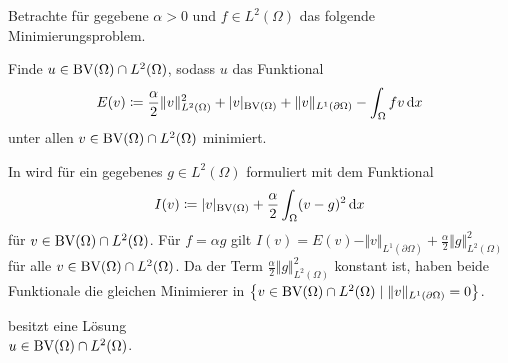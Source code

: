 Betrachte für gegebene $\alpha>0$ und $f\in L^2(\Omega)$ das 
folgende Minimierungsproblem. 

\begin{problem}\label{prob:continuousProblem}
  Finde $u\in \textup{BV}(\Omega)\cap L^2(\Omega)$, sodass
  $u$ das Funktional
  \begin{align}\label{eq:continuousProblem}
    E(v)\coloneqq \frac{\alpha}{2}\Vert v\Vert_{L^2(\Omega)}^2 + |v|_{\textup{BV}(\Omega)}
    +\Vert v\Vert_{L^1(\partial\Omega)}-\int_\Omega fv\,\mathrm{d}x
  \end{align}
  unter allen $v\in\textup{BV}(\Omega)\cap L^2(\Omega)$ minimiert.
\end{problem}

\begin{remark}
  In \cite[Kapitel~10.1.3]{Bar15} wird  für ein
  gegebenes $g\in L^2(\Omega)$ formuliert
  mit dem Funktional 
  \begin{align*}
    I(v)\coloneqq |v|_{\textup{BV}(\Omega)} + \frac{\alpha}{2}\int_\Omega (v-g)^2\,\mathrm{d}x
  \end{align*}
  für $v\in \textup{BV}(\Omega)\cap L^2(\Omega)$.
  Für $f = \alpha g$ gilt
  $I(v) = E(v) - \Vert v\Vert_{L^1(\partial \Omega)}+ 
  \frac{\alpha}{2}\Vert g\Vert_{L^2(\Omega)}^2$ für alle 
  $v\in \textup{BV}(\Omega)\cap L^2(\Omega)$. Da der Term $\frac{\alpha}{2}\Vert
  g\Vert_{L^2(\Omega)}^2$ konstant ist, haben beide Funktionale die
  gleichen Minimierer in $\left\{v\in\textup{BV}(\Omega)\cap L^2(\Omega)\mid 
  \Vert v\Vert_{L^1(\partial\Omega)}=0\right\}$.
\end{remark}

\begin{theorem}
  \label{thm:contProblemExistence}
   besitzt eine Lösung \\$u\in\textup{BV}(\Omega)\cap
  L^2(\Omega)$.
\end{theorem}

